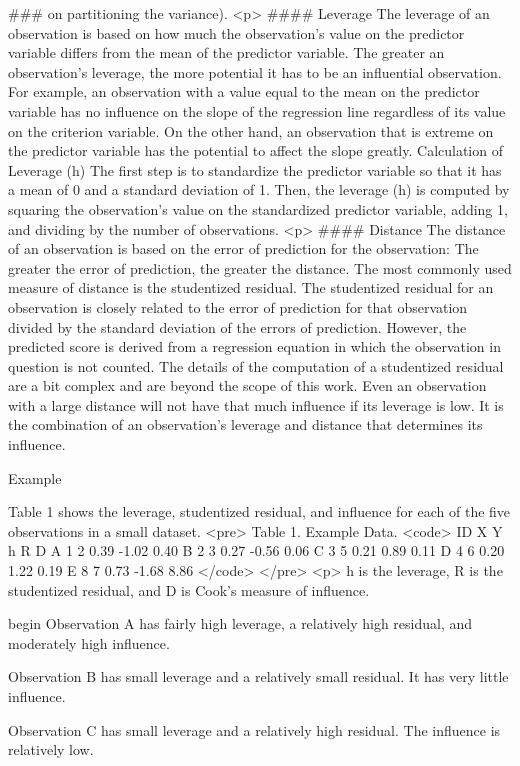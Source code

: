 ###  on partitioning the variance).
<p>
####      {Leverage}
The leverage of an observation is based on how much the observation's value on the predictor variable differs from the mean of the predictor variable. The greater an observation's leverage, the more potential it has to be an influential observation. For example, an observation with a value equal to the mean on the predictor variable has no influence on the slope of the regression line regardless of its value on the criterion variable. On the other hand, an observation that is extreme on the predictor variable has the potential to affect the slope greatly.
Calculation of Leverage (h)
The first step is to standardize the predictor variable so that it has a mean of 0 and a standard deviation of 1. Then, the leverage (h) is computed by squaring the observation's value on the standardized predictor variable, adding 1, and dividing by the number of observations.
<p>
####      {Distance}
The distance of an observation is based on the error of prediction for the observation: The greater the error of prediction, the greater the distance. The most commonly used measure of distance is the studentized residual. The studentized residual for an observation is closely related to the error of prediction for that observation divided by the standard deviation of the errors of prediction. However, the predicted score is derived from a regression equation in which the observation in question is not counted. The details of the computation of a studentized residual are a bit complex and are beyond the scope of this work.
Even an observation with a large distance will not have that much influence if its leverage is low. It is the combination of an observation's leverage and distance that determines its influence.

Example

Table 1 shows the leverage, studentized residual, and influence for each of the five observations in a small dataset.
<pre>
Table 1. Example Data.
<code>
ID	X	Y	h	R	D
A	1	2	0.39	-1.02	0.40
B	2	3	0.27	-0.56	0.06
C	3	5	0.21	0.89	0.11
D	4	6	0.20	1.22	0.19
E	8	7	0.73	-1.68	8.86
</code>
</pre>
<p>
h is the leverage, R is the studentized residual, and D is Cook's measure of influence.

begin{ }
       Observation A has fairly high leverage, a relatively high residual, and moderately high influence.

       Observation B has small leverage and a relatively small residual. It has very little influence.

       Observation C has small leverage and a relatively high residual. The influence is relatively low.

